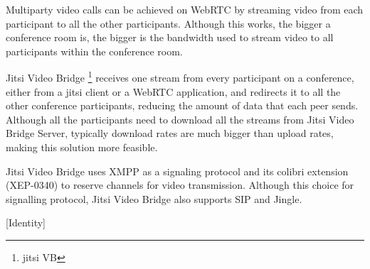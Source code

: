 	
	Multiparty video calls can be achieved on \ac{WebRTC} by streaming video from each participant to all the other participants. Although this works, the bigger a conference room is, the bigger is the bandwidth used to stream video to all participants within the conference room.

	Jitsi Video Bridge \footnote{jitsi VB} receives one stream from every participant on a conference, either from a jitsi client or a \ac{WebRTC} application, and redirects it to all the other conference participants, reducing the amount of data that each peer sends. Although all the participants need to download all the streams from Jitsi Video Bridge Server, typically download rates are much bigger than upload rates, making this solution more feasible.

	Jitsi Video Bridge uses \ac{XMPP} as a signaling protocol and its colibri extension (XEP-0340) to reserve channels for video transmission. Although this choice for signalling protocol, Jitsi Video Bridge also supports \ac{SIP} and \ac{Jingle}.


  {\color{red}[Identity]}



